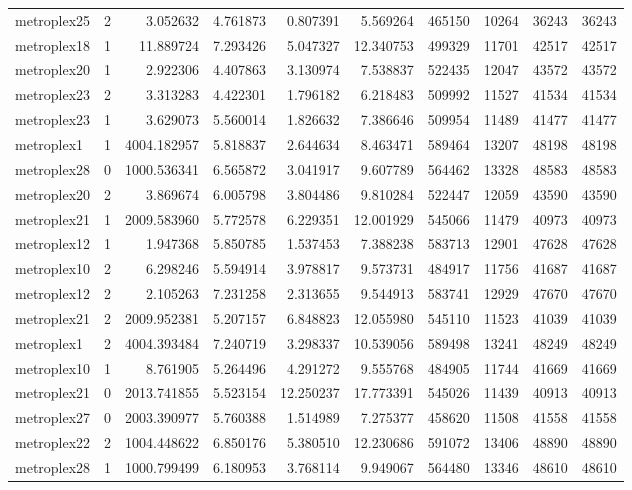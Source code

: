 \begin{longtable}{|l|r|r|r|r|r|r|r|r|r|}
metroplex25 & 2 & 3.052632 & 4.761873 & 0.807391 & 5.569264 & 465150 & 10264 & 36243 & 36243 \\
metroplex18 & 1 & 11.889724 & 7.293426 & 5.047327 & 12.340753 & 499329 & 11701 & 42517 & 42517 \\
metroplex20 & 1 & 2.922306 & 4.407863 & 3.130974 & 7.538837 & 522435 & 12047 & 43572 & 43572 \\
metroplex23 & 2 & 3.313283 & 4.422301 & 1.796182 & 6.218483 & 509992 & 11527 & 41534 & 41534 \\
metroplex23 & 1 & 3.629073 & 5.560014 & 1.826632 & 7.386646 & 509954 & 11489 & 41477 & 41477 \\
metroplex1 & 1 & 4004.182957 & 5.818837 & 2.644634 & 8.463471 & 589464 & 13207 & 48198 & 48198 \\
metroplex28 & 0 & 1000.536341 & 6.565872 & 3.041917 & 9.607789 & 564462 & 13328 & 48583 & 48583 \\
metroplex20 & 2 & 3.869674 & 6.005798 & 3.804486 & 9.810284 & 522447 & 12059 & 43590 & 43590 \\
metroplex21 & 1 & 2009.583960 & 5.772578 & 6.229351 & 12.001929 & 545066 & 11479 & 40973 & 40973 \\
metroplex12 & 1 & 1.947368 & 5.850785 & 1.537453 & 7.388238 & 583713 & 12901 & 47628 & 47628 \\
metroplex10 & 2 & 6.298246 & 5.594914 & 3.978817 & 9.573731 & 484917 & 11756 & 41687 & 41687 \\
metroplex12 & 2 & 2.105263 & 7.231258 & 2.313655 & 9.544913 & 583741 & 12929 & 47670 & 47670 \\
metroplex21 & 2 & 2009.952381 & 5.207157 & 6.848823 & 12.055980 & 545110 & 11523 & 41039 & 41039 \\
metroplex1 & 2 & 4004.393484 & 7.240719 & 3.298337 & 10.539056 & 589498 & 13241 & 48249 & 48249 \\
metroplex10 & 1 & 8.761905 & 5.264496 & 4.291272 & 9.555768 & 484905 & 11744 & 41669 & 41669 \\
metroplex21 & 0 & 2013.741855 & 5.523154 & 12.250237 & 17.773391 & 545026 & 11439 & 40913 & 40913 \\
metroplex27 & 0 & 2003.390977 & 5.760388 & 1.514989 & 7.275377 & 458620 & 11508 & 41558 & 41558 \\
metroplex22 & 2 & 1004.448622 & 6.850176 & 5.380510 & 12.230686 & 591072 & 13406 & 48890 & 48890 \\
metroplex28 & 1 & 1000.799499 & 6.180953 & 3.768114 & 9.949067 & 564480 & 13346 & 48610 & 48610 \\

\end{longtable}
